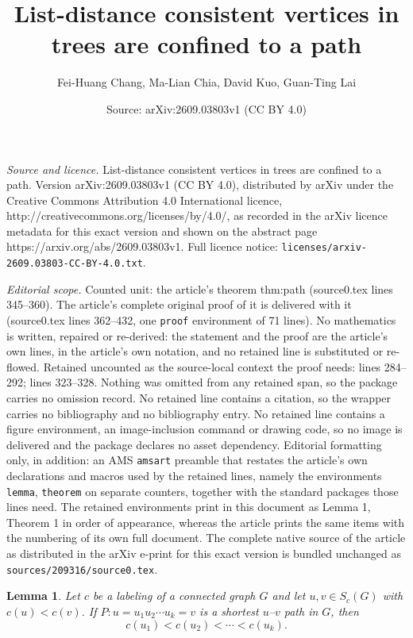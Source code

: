 \documentclass[10pt,a4paper]{amsart}
\title{List-distance consistent vertices in trees are confined to a path}
\author{Fei-Huang Chang, Ma-Lian Chia, David Kuo, Guan-Ting Lai}
\date{Source: arXiv:2609.03803v1 (CC BY 4.0)}
\newtheorem{lemma}{Lemma}
\begin{document}
\maketitle

\noindent\emph{Source and licence.} List-distance consistent vertices in trees are confined to a path. Version arXiv:2609.03803v1 (CC BY 4.0), distributed by arXiv under the Creative Commons Attribution 4.0 International licence, http://creativecommons.org/licenses/by/4.0/, as recorded in the arXiv licence metadata for this exact version and shown on the abstract page https://arxiv.org/abs/2609.03803v1. Full licence notice: \texttt{licenses/arxiv-2609.03803-CC-BY-4.0.txt}.\par\smallskip

\noindent\textit{Editorial scope.} Counted unit: the article's theorem thm:path (source0.tex lines 345--360). The article's complete original proof of it is delivered with it (source0.tex lines 362--432, one \texttt{proof} environment of 71 lines). No mathematics is written, repaired or re-derived: the statement and the proof are the article's own lines, in the article's own notation, and no retained line is substituted or re-flowed.  Retained uncounted as the source-local context the proof needs: lines 284--292; lines 323--328.  Nothing was omitted from any retained span, so the package carries no omission record.  No retained line contains a citation, so the wrapper carries no bibliography and no bibliography entry.  No retained line contains a figure environment, an image-inclusion command or drawing code, so no image is delivered and the package declares no asset dependency.  Editorial formatting only, in addition: an AMS \texttt{amsart} preamble that restates the article's own declarations and macros used by the retained lines, namely the environments \texttt{lemma}, \texttt{theorem} on separate counters, together with the standard packages those lines need.  The retained environments print in this document as Lemma 1, Theorem 1 in order of appearance, whereas the article prints the same items with the numbering of its own full document.  The complete native source of the article as distributed in the arXiv e-print for this exact version is bundled unchanged as \texttt{sources/209316/source0.tex}.
\begin{lemma}
\label{lem:monotone}
Let $c$ be a labeling of a connected graph $G$ and let $u,v\in S_c(G)$ with
$c(u)<c(v)$. If $P:u=u_1u_2\cdots u_k=v$ is a shortest $u$--$v$ path in $G$,
then
\[
  c(u_1)<c(u_2)<\cdots<c(u_k).
\]
\end{lemma}
\end{document}

